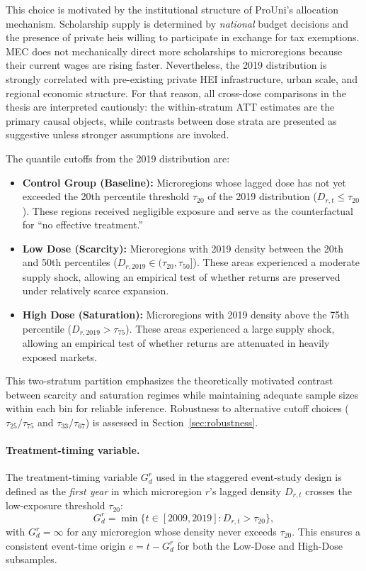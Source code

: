 This choice is motivated by the institutional structure of ProUni's allocation mechanism. Scholarship supply is determined by \emph{national} budget decisions and the presence of private \acrshort{hei}s willing to participate in exchange for tax exemptions. MEC does not mechanically direct more scholarships to microregions because their current wages are rising faster. Nevertheless, the 2019 distribution is strongly correlated with pre-existing private HEI infrastructure, urban scale, and regional economic structure. For that reason, all cross-dose comparisons in the thesis are interpreted cautiously: the within-stratum ATT estimates are the primary causal objects, while contrasts between dose strata are presented as suggestive unless stronger assumptions are invoked.

The quantile cutoffs from the 2019 distribution are:

\begin{itemize}
    \item \textbf{Control Group (Baseline):} Microregions whose lagged dose has not yet exceeded the 20th percentile threshold $\tau_{20}$ of the 2019 distribution ($D_{r,t} \leq \tau_{20}$). These regions received negligible exposure and serve as the counterfactual for ``no effective treatment.''
    \item \textbf{Low Dose (Scarcity):} Microregions with 2019 density between the 20th and 50th percentiles ($D_{r,2019} \in (\tau_{20}, \tau_{50}]$). These areas experienced a moderate supply shock, allowing an empirical test of whether returns are preserved under relatively scarce expansion.
    \item \textbf{High Dose (Saturation):} Microregions with 2019 density above the 75th percentile ($D_{r,2019} > \tau_{75}$). These areas experienced a large supply shock, allowing an empirical test of whether returns are attenuated in heavily exposed markets.
\end{itemize}

This two-stratum partition emphasizes the theoretically motivated contrast between scarcity and saturation regimes while maintaining adequate sample sizes within each bin for reliable inference. Robustness to alternative cutoff choices ($\tau_{25}/\tau_{75}$ and $\tau_{33}/\tau_{67}$) is assessed in Section~\ref{sec:robustness}.


\paragraph{Treatment-timing variable.}
The treatment-timing variable $G_d^r$ used in the staggered event-study design is defined as the \emph{first year} in which microregion $r$'s lagged density $D_{r,t}$ crosses the low-exposure threshold $\tau_{20}$:
\begin{equation}
    G_d^r = \min\bigl\{t \in [2009, 2019] : D_{r,t} > \tau_{20}\bigr\},
    \label{eq:first_treat}
\end{equation}
with $G_d^r = \infty$ for any microregion whose density never exceeds $\tau_{20}$. This ensures a consistent event-time origin $e = t - G_d^r$ for both the Low-Dose and High-Dose subsamples.


